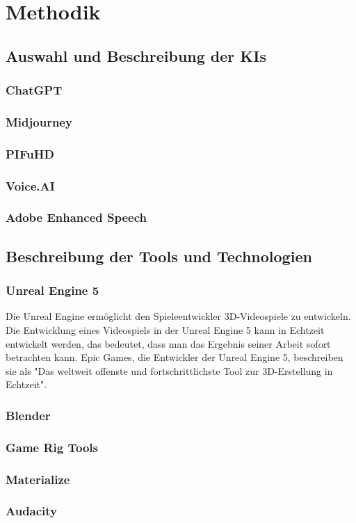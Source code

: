 \chapter{Methodik}

\section{Auswahl und Beschreibung der KIs}
\subsection{ChatGPT}
\subsection{Midjourney}
\subsection{PIFuHD}
\subsection{Voice.AI}
\subsection{Adobe Enhanced Speech}

\section{Beschreibung der Tools und Technologien}
\subsection{Unreal Engine 5}
Die Unreal Engine ermöglicht den Spieleentwickler 3D-Videospiele zu entwickeln. Die Entwicklung eines Videospiels in der Unreal Engine 5 kann in Echtzeit entwickelt werden, das bedeutet, dass man das Ergebnis seiner Arbeit sofort betrachten kann. Epic Games, die Entwickler der Unreal Engine 5, beschreiben sie als "Das weltweit offenste und fortschrittlichste Tool zur 3D-Erstellung in Echtzeit".
\subsection{Blender}
\subsection{Game Rig Tools}
\subsection{Materialize}
\subsection{Audacity}
